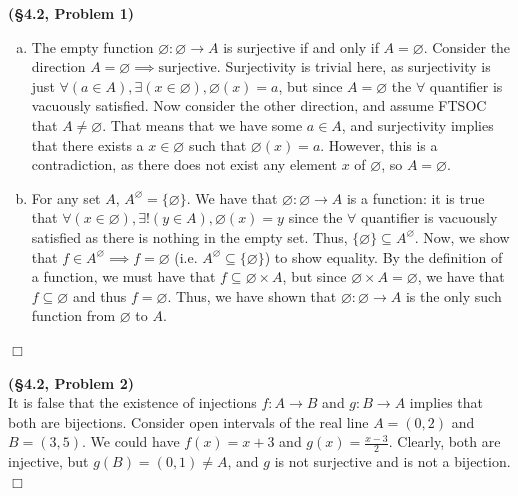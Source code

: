 \documentclass[12pt]{article}
\theoremstyle{definition}
\newenvironment{Solution}{\noindent {\sc Solution.}}{$\Box$ \vspace{2 ex}}
\begin{document}
\begin{Solution}
{\bf (\S4.2, Problem 1)}\\
\begin{enumerate}[(a)]
\item The empty function $\varnothing : \varnothing \to A$ is surjective if and only if $A = \varnothing$. Consider the direction $A =\varnothing \implies \text{surjective}$. Surjectivity is trivial here, as surjectivity is just $\forall (a \in A), \exists(x\in \varnothing), \varnothing(x)=a$, but since $A=\varnothing$ the $\forall$ quantifier is vacuously satisfied. Now consider the other direction, and assume FTSOC that $A \ne \varnothing$. That means that we have some $a \in A$, and surjectivity implies that there exists a $x \in \varnothing$ such that $\varnothing(x) = a$. However, this is a contradiction, as there does not exist any element $x$ of $\varnothing$, so $A=\varnothing$.
\item For any set $A$, $A^\varnothing = \{\varnothing\}$. We have that $\varnothing : \varnothing \to A$ is a function: it is true that $\forall (x \in \varnothing), \exists!(y \in A),\varnothing(x)=y$ since the $\forall$ quantifier is vacuously satisfied as there is nothing in the empty set. Thus, $\{\varnothing\} \subseteq A^\varnothing$. Now, we show that $f \in A^\varnothing \implies f =\varnothing$ (i.e. $A^\varnothing \subseteq \{\varnothing\}$) to show equality. By the definition of a function, we must have that $f \subseteq \varnothing \times A$, but since $\varnothing \times A = \varnothing$, we have that $f \subseteq \varnothing$ and thus $f = \varnothing$. Thus, we have shown that $\varnothing : \varnothing \to A$ is the only such function from $\varnothing$ to $A$.
\end{enumerate}
\end{Solution}

\vspace{0.5cm}

\begin{Solution}
{\bf (\S4.2, Problem 2)}\\
It is false that the existence of injections $f : A \to B$ and $g : B \to A$ implies that both are bijections. Consider open intervals of the real line $A = (0,2)$ and $B = (3, 5)$. We could have $f(x)=x+3$ and $g(x)=\frac{x-3}{2}$. Clearly, both are injective, but $g(B)=(0,1) \ne A$, and $g$ is not surjective and is not a bijection. 
\end{Solution}
\end{document}

